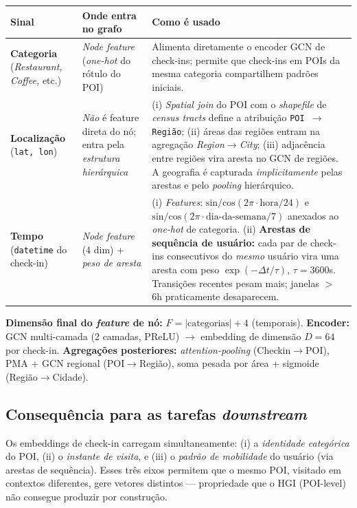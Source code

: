 \documentclass[11pt,a4paper]{article}
\begin{document}
\begin{table}[H]
\centering
\footnotesize
\begin{tabular}{p{3.5cm}p{5cm}p{6cm}}
\toprule
\textbf{Sinal} & \textbf{Onde entra no grafo} & \textbf{Como é usado} \\
\midrule
\textbf{Categoria} (\textit{Restaurant, Coffee,} etc.) & \textit{Node feature} (\textit{one-hot} do rótulo do POI) & Alimenta diretamente o encoder GCN de check-ins; permite que check-ins em POIs da mesma categoria compartilhem padrões iniciais. \\
\midrule
\textbf{Localização} (\texttt{lat, lon}) & \emph{Não} é feature direta do nó; entra pela \textit{estrutura hierárquica} & (i) \textit{Spatial join} do POI com o \textit{shapefile} de \textit{census tracts} define a atribuição \texttt{POI $\to$ Região}; (ii) áreas das regiões entram na agregação \textit{Region$\to$City}; (iii) adjacência entre regiões vira aresta no GCN de regiões. A geografia é capturada \textit{implicitamente} pelas arestas e pelo \textit{pooling} hierárquico. \\
\midrule
\textbf{Tempo} (\texttt{datetime} do check-in) & \textit{Node feature} (4 dim) + \textit{peso de aresta} & (i) \textit{Features}: $\text{sin/cos}(2\pi \cdot \text{hora}/24)$ e $\text{sin/cos}(2\pi \cdot \text{dia-da-semana}/7)$ anexados ao \textit{one-hot} de categoria. (ii) \textbf{Arestas de sequência de usuário:} cada par de check-ins consecutivos do \emph{mesmo} usuário vira uma aresta com peso $\exp(-\Delta t / \tau)$, $\tau = 3600$s. Transições recentes pesam mais; janelas $>$ 6h praticamente desaparecem. \\
\bottomrule
\end{tabular}
\end{table}

\noindent\textbf{Dimensão final do \textit{feature} de nó:} $F = |\text{categorias}| + 4$ (temporais). \textbf{Encoder:} GCN multi-camada (2 camadas, PReLU) $\to$ embedding de dimensão $D = 64$ por check-in. \textbf{Agregações posteriores:} \textit{attention-pooling} (Checkin$\to$POI), PMA + GCN regional (POI$\to$Região), soma pesada por área + sigmoide (Região$\to$Cidade).

\subsection*{Consequência para as tarefas \textit{downstream}}

Os embeddings de check-in carregam simultaneamente: (i) a \emph{identidade categórica} do POI, (ii) o \emph{instante de visita}, e (iii) o \emph{padrão de mobilidade} do usuário (via arestas de sequência). Esses três eixos permitem que o mesmo POI, visitado em contextos diferentes, gere vetores distintos --- propriedade que o HGI (POI-level) não consegue produzir por construção.
\end{document}
